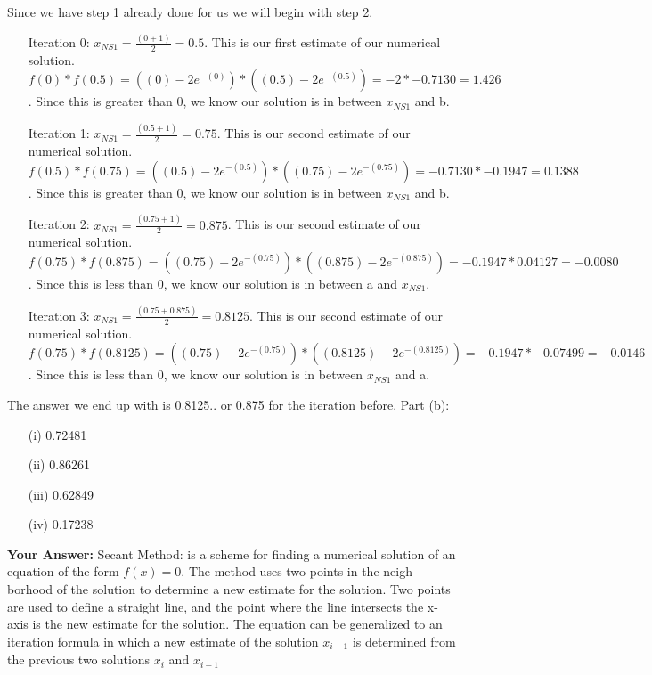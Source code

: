 \documentclass[12pt]{report}
\begin{document}
Since we have step 1 already done for us we will begin with step 2.
\begin{itemize}
\item[Iteration 0:] $x_{NS1} = \frac{(0+1)}{2} = 0.5$. This is our first estimate of our numerical solution. $f(0) * f(0.5) = ((0) - 2e^{-(0)}) * ((0.5) - 2e^{-(0.5)}) = -2 * -0.7130 = 1.426$. Since this is greater than 0, we know our solution is in between $x_{NS1}$ and b.
\item[Iteration 1:] $x_{NS1} = \frac{(0.5+1)}{2} = 0.75$. This is our second estimate of our numerical solution. $f(0.5) * f(0.75) = ((0.5) - 2e^{-(0.5)}) * ((0.75) - 2e^{-(0.75)}) = -0.7130 * -0.1947 = 0.1388$. Since this is greater than 0, we know our solution is in between $x_{NS1}$ and b.
\item[Iteration 2:] $x_{NS1} = \frac{(0.75+1)}{2} = 0.875$. This is our second estimate of our numerical solution. $f(0.75) * f(0.875) = ((0.75) - 2e^{-(0.75)}) * ((0.875) - 2e^{-(0.875)}) = -0.1947 * 0.04127 = -0.0080$. Since this is less than 0, we know our solution is in between a and $x_{NS1}$.
\item[Iteration 3:] $x_{NS1} = \frac{(0.75+0.875)}{2} = 0.8125$. This is our second estimate of our numerical solution. $f(0.75) * f(0.8125) = ((0.75) - 2e^{-(0.75)}) * ((0.8125) - 2e^{-(0.8125)}) = -0.1947 * -0.07499 = -0.0146$. Since this is less than 0, we know our solution is in between $x_{NS1}$ and a.
\end{itemize}
The answer we end up with is 0.8125.. or 0.875 for the iteration before.
\newline
\newline
Part (b):
\begin{itemize}
\item[(i)] 0.72481
\item[(ii)] 0.86261
\item[(iii)] 0.62849
\item[(iv)] 0.17238
\end{itemize}
\textbf{Your Answer:}
\newline
Secant Method: is a scheme for finding a  numerical solution of an equation of the form $f(x) = 0$. The method uses two points in the neigh­borhood of the solution to  determine a new estimate for the solution. Two points are used to define a straight line, and the point where the line intersects the x-axis is the new estimate for the solution. 
\newline
The equation can be generalized to an iteration formula in which a new estimate of the solution $x_{i+1}$ is determined from the previous two solutions $x_i$ and $x_{i-1}$
\end{document}
